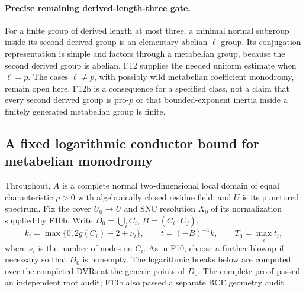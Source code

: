 \paragraph{Precise remaining derived-length-three gate.}
For a finite group of derived length at most three, a minimal
normal subgroup inside its second derived group is an elementary
abelian $\ell$-group. Its conjugation representation is simple
and factors through a metabelian group, because the second derived
group is abelian. F12 supplies the needed uniform estimate when
$\ell=p$. The cases $\ell\ne p$, with possibly wild metabelian
coefficient monodromy, remain open here. F12b is a consequence
for a specified class, not a claim that every second derived group
is pro-$p$ or that bounded-exponent inertia inside a finitely
generated metabelian group is finite.

\subsection{A fixed logarithmic conductor bound for metabelian monodromy}

Throughout, $A$ is a complete normal two-dimensional local domain
of equal characteristic $p>0$ with algebraically closed residue field,
and $U$ is its punctured spectrum. Fix the cover $U_0\to U$ and
SNC resolution $X_0$ of its normalization supplied by F10b. Write
$D_0=\bigcup_i C_i$, $B=(C_i\cdot C_j)$,
\[
 k_i=\max\{0,2g(C_i)-2+\nu_i\},\qquad
 t=(-B)^{-1}k,\qquad T_0=\max_i t_i,
 \tag{F13.1}
\]
where $\nu_i$ is the number of nodes on $C_i$. As in F10, choose
a further blowup if necessary so that $D_0$ is nonempty.
The logarithmic breaks below are computed over the completed DVRs
at the generic points of $D_0$. The complete proof passed an
independent root audit; F13b also passed a separate BCE geometry audit.

